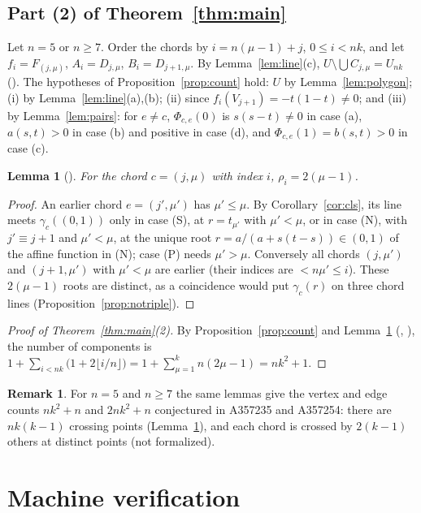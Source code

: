 \documentclass[11pt]{amsart}
\theoremstyle{plain}
\newtheorem{lemma}[theorem]{Lemma}
\theoremstyle{definition}
\newtheorem{remark}[theorem]{Remark}
\begin{document}
\subsection{Part (2) of Theorem~\ref{thm:main}}
Let $n=5$ or $n\ge7$. Order the chords by $i=n(\mu-1)+j$, $0\le i<nk$, and let $f_i=F_{(j,\mu)}$, $A_i=D_{j,\mu}$, $B_i=D_{j+1,\mu}$. By Lemma~\ref{lem:line}(c), $U\setminus\bigcup C_{j,\mu}=U_{nk}$ (). The hypotheses of Proposition~\ref{prop:count} hold: $U$ by Lemma~\ref{lem:polygon}; (i) by Lemma~\ref{lem:line}(a),(b); (ii) since $f_i(V_{j+1})=-t(1-t)\ne0$; and (iii) by Lemma~\ref{lem:pairs}: for $e\ne c$, $\Phi_{c,e}(0)$ is $s(s-t)\ne0$ in case (a), $a(s,t)>0$ in case (b) and positive in case (d), and $\Phi_{c,e}(1)=b(s,t)>0$ in case (c).

\begin{lemma}[]\label{lem:roots}
For the chord $c=(j,\mu)$ with index $i$, $\rho_i=2(\mu-1)$.
\end{lemma}

\begin{proof}
An earlier chord $e=(j',\mu')$ has $\mu'\le\mu$. By Corollary~\ref{cor:cls}, its line meets $\gamma_c((0,1))$ only in case (S), at $r=t_{\mu'}$ with $\mu'<\mu$, or in case (N), with $j'\equiv j+1$ and $\mu'<\mu$, at the unique root $r=a/(a+s(t-s))\in(0,1)$ of the affine function in (N); case (P) needs $\mu'>\mu$. Conversely all chords $(j,\mu')$ and $(j+1,\mu')$ with $\mu'<\mu$ are earlier (their indices are $<n\mu'\le i$). These $2(\mu-1)$ roots are distinct, as a coincidence would put $\gamma_c(r)$ on three chord lines (Proposition~\ref{prop:notriple}).
\end{proof}

\begin{proof}[Proof of Theorem~\ref{thm:main}(2)]
By Proposition~\ref{prop:count} and Lemma~\ref{lem:roots} (, ), the number of components is
$1+\sum_{i<nk}\bigl(1+2\lfloor i/n\rfloor\bigr)=1+\sum_{\mu=1}^{k}n(2\mu-1)=nk^2+1$.
\end{proof}

\begin{remark}
For $n=5$ and $n\ge7$ the same lemmas give the vertex and edge counts $nk^2+n$ and $2nk^2+n$ conjectured in A357235 and A357254: there are $nk(k-1)$ crossing points (Lemma~\ref{lem:roots}), and each chord is crossed by $2(k-1)$ others at distinct points (not formalized).
\end{remark}

\section{Machine verification}\label{sec:lean}
\end{document}
